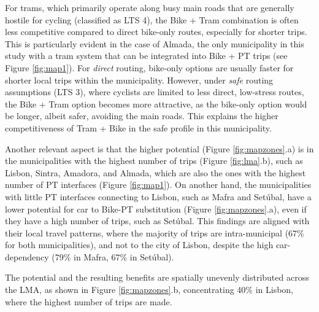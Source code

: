 \documentclass[review, doubleblind, 3p,
authoryear]{elsarticle} %
\begin{document}
For trams, which primarily operate along busy main roads that are
generally hostile for cycling (classified as LTS 4), the Bike + Tram
combination is often less competitive compared to direct bike-only
routes, especially for shorter trips. This is particularly evident in
the case of Almada, the only municipality in this study with a tram
system that can be integrated into Bike + PT trips (see Figure
\ref{fig:map1}). For \emph{direct} routing, bike-only options are
usually faster for shorter local trips within the municipality. However,
under \emph{safe} routing assumptions (LTS 3), where cyclists are
limited to less direct, low-stress routes, the Bike + Tram option
becomes more attractive, as the bike-only option would be longer, albeit
safer, avoiding the main roads. This explains the higher competitiveness
of Tram + Bike in the safe profile in this municipality.

Another relevant aspect is that the higher potential (Figure
\ref{fig:mapzones}.a) is in the municipalities with the highest number
of trips (Figure \ref{fig:lma}.b), such as Lisbon, Sintra, Amadora, and
Almada, which are also the ones with the highest number of PT interfaces
(Figure \ref{fig:map1}). On another hand, the municipalities with little
PT interfaces connecting to Lisbon, such as Mafra and Setúbal, have a
lower potential for car to Bike-PT substitution (Figure
\ref{fig:mapzones}.a), even if they have a high number of trips, such as
Setúbal. This findings are aligned with their local travel patterns,
where the majority of trips are intra-municipal (67\% for both
municipalities), and not to the city of Lisbon, despite the high
car-dependency (79\% in Mafra, 67\% in Setúbal).

The potential and the resulting benefits are spatially unevenly
distributed across the LMA, as shown in Figure \ref{fig:mapzones}.b,
concentrating 40\% in Lisbon, where the highest number of trips are
made.
\end{document}
